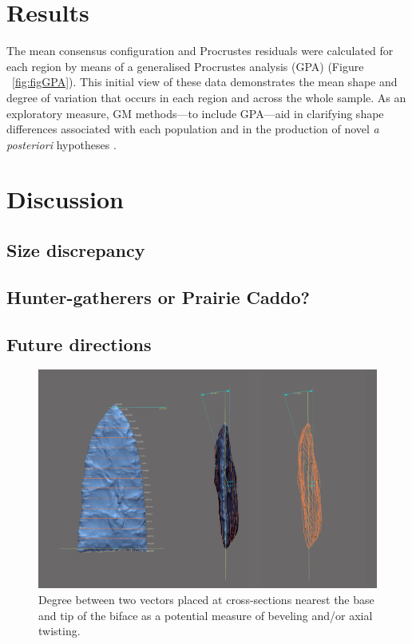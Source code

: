\documentclass[review]{elsarticle}
\begin{document}
\section*{Results}

The mean consensus configuration and Procrustes residuals were calculated for each region by means of a generalised Procrustes analysis (GPA) \citep[Figure 3]{RN1720} (Figure ~\ref{fig:figGPA}). This initial view of these data demonstrates the mean shape and degree of variation that occurs in each region and across the whole sample. As an exploratory measure, GM methods---to include GPA---aid in clarifying shape differences associated with each population and in the production of novel \textit{a posteriori} hypotheses \citep{RN1720}.

\section*{Discussion}



\subsection*{Size discrepancy}



\subsection*{Hunter-gatherers or Prairie Caddo?}



\subsection*{Future directions}



\begin{figure}[ht]\centering
\includegraphics[width=\linewidth]{gahagan-beveling.pdf}
\caption{Degree between two vectors placed at cross-sections nearest the base and tip of the biface as a potential measure of beveling and/or axial twisting.}
\label{fig:beveling}
\end{figure}
\end{document}
